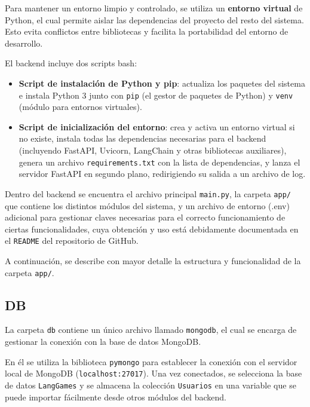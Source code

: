 Para mantener un entorno limpio y controlado, se utiliza un \textbf{entorno virtual} de Python, el cual permite aislar las dependencias del proyecto del resto del sistema. Esto evita conflictos entre bibliotecas y facilita la portabilidad del entorno de desarrollo.

El backend incluye dos scripts bash:

\begin{itemize}
	\item \textbf{Script de instalación de Python y pip}: actualiza los paquetes del sistema e instala Python 3 junto con \texttt{pip} (el gestor de paquetes de Python) y \texttt{venv} (módulo para entornos virtuales).
	
	\item \textbf{Script de inicialización del entorno}: crea y activa un entorno virtual si no existe, instala todas las dependencias necesarias para el backend (incluyendo FastAPI, Uvicorn, LangChain y otras bibliotecas auxiliares), genera un archivo \texttt{requirements.txt} con la lista de dependencias, y lanza el servidor FastAPI en segundo plano, redirigiendo su salida a un archivo de log.
\end{itemize}

Dentro del backend se encuentra el archivo principal \texttt{main.py}, la carpeta \texttt{app/} que contiene los distintos módulos del sistema, y un archivo de entorno (.env) adicional para gestionar claves necesarias para el correcto funcionamiento de ciertas funcionalidades, cuya obtención y uso está debidamente documentada en el \texttt{README} del repositorio de GitHub.

A continuación, se describe con mayor detalle la estructura y funcionalidad de la carpeta \texttt{app/}.


\subsection{DB}

La carpeta \texttt{db} contiene un único archivo llamado \texttt{mongodb}, el cual se encarga de gestionar la conexión con la base de datos MongoDB.

En él se utiliza la biblioteca \texttt{pymongo} para establecer la conexión con el servidor local de MongoDB (\texttt{localhost:27017}). Una vez conectados, se selecciona la base de datos \texttt{LangGames} y se almacena la colección \texttt{Usuarios} en una variable que se puede importar fácilmente desde otros módulos del backend.

